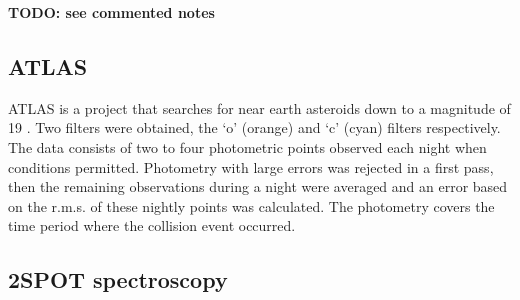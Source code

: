 \documentclass{aa}
\begin{document}
\textbf{TODO: see commented notes}



\subsection{ATLAS}

ATLAS is a project that searches for near earth asteroids down to a magnitude of 19 \citep{Tonry18}.
%
Two filters were obtained, the `o' (orange) and `c' (cyan) filters respectively.
%
The data consists of two to four photometric points observed each night when conditions permitted.
%
Photometry with large errors was rejected in a first pass, then the remaining observations during a night were averaged and an error based on the r.m.s. of these nightly points was calculated.
%
The photometry covers the time period where the collision event occurred. 

\subsection{2SPOT spectroscopy}
\end{document}
